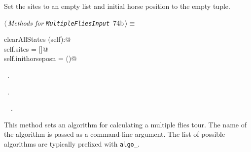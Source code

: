 \documentclass[11.5pt]{report}
\begin{document}
\vspace{-0.8cm}
\newchunk Set the sites to an empty list and initial horse position to the empty tuple.
\begin{flushleft} \small\label{scrap111}\raggedright\small
{} $\langle\,${\itshape Methods for \verb|MultipleFliesInput|}\nobreak\ {\footnotesize {74b}}$\,\rangle\equiv$
\vspace{-1ex}
\begin{list}{}{} \item
\mbox{}\verb@def clearAllStates (self):@\\
\mbox{}\verb@   self.sites = []@\\
\mbox{}\verb@   self.inithorseposn = ()@\\
\mbox{}\verb@@{\NWsep}
\end{list}
\vspace{-1.5ex}
\footnotesize
\begin{list}{}{\setlength{\itemsep}{-\parsep}\setlength{\itemindent}{-\leftmargin}}
\item \NWtxtMacroDefBy\ .
\item \NWtxtMacroRefIn\ .
\item \NWtxtIdentsDefed\nobreak\  \verb@clearAllStates@\nobreak\ .
\item{}
\end{list}
\vspace{4ex}
\end{flushleft}


\vspace{-0.8cm} \newchunk 
This method sets an algorithm for calculating
a multiple flies tour. The name of the algorithm is passed as a command-line argument.  
The list of possible algorithms are typically prefixed with \verb|algo_|. 
          
\end{document}
